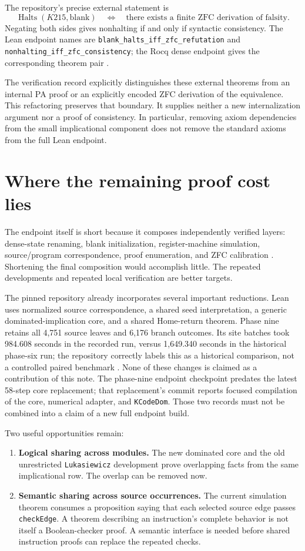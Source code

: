\documentclass[11pt,letterpaper]{article}
\newcommand{\Halts}{\operatorname{Halts}}
\begin{document}
The repository's precise external statement is
\[
  \Halts(K215,\mathrm{blank})
  \quad\Longleftrightarrow\quad
  \text{there exists a finite ZFC derivation of falsity}.
\]
Negating both sides gives nonhalting if and only if syntactic consistency. The
Lean endpoint names are \texttt{blank\_halts\_iff\_zfc\_refutation} and
\texttt{nonhalting\_iff\_zfc\_consistency}; the Rocq dense endpoint gives the
corresponding theorem pair \cite{verification,endpoint}.

The verification record explicitly distinguishes these external theorems from
an internal PA proof or an explicitly encoded ZFC derivation of the equivalence.
This refactoring preserves that boundary. It supplies neither a new
internalization argument nor a proof of consistency. In particular, removing
axiom dependencies from the small implicational component does not remove the
standard axioms from the full Lean endpoint.

\section{Where the remaining proof cost lies}

The endpoint itself is short because it composes independently verified layers:
dense-state renaming, blank initialization, register-machine simulation,
source/program correspondence, proof enumeration, and ZFC calibration
\cite{formalreadme,endpoint}. Shortening the final composition would accomplish
little. The repeated developments and repeated local verification are better
targets.

The pinned repository already incorporates several important reductions. Lean
uses normalized source correspondence, a shared seed interpretation, a generic
dominated-implication core, and a shared Home-return theorem. Phase nine retains
all 4,751 source leaves and 6,176 branch outcomes. Its site batches took 984.608
seconds in the recorded run, versus 1,649.340 seconds in the historical
phase-six run; the repository correctly labels this as a historical comparison,
not a controlled paired benchmark \cite{phase9}. None of these changes is
claimed as a contribution of this note. The phase-nine endpoint checkpoint
predates the latest 58-step core replacement; that replacement's commit reports
focused compilation of the core, numerical adapter, and \texttt{KCodeDom}.
Those two records must not be combined into a claim of a new full endpoint build.

Two useful opportunities remain:
\begin{enumerate}
\item \textbf{Logical sharing across modules.} The new dominated core and the
old unrestricted \texttt{Lukasiewicz} development prove overlapping facts from
the same implicational row. The overlap can be removed now.
\item \textbf{Semantic sharing across source occurrences.} The current
simulation theorem consumes a proposition saying that each selected source
edge passes \texttt{checkEdge}. A theorem describing an instruction's complete
behavior is not itself a Boolean-checker proof. A semantic interface is needed
before shared instruction proofs can replace the repeated checks.
\end{enumerate}
\end{document}
